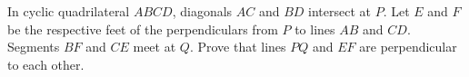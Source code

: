 In cyclic quadrilateral $ABCD$, diagonals $AC$ and $BD$ intersect at $P$. Let $E$ and $F$ be the respective feet of the perpendiculars from $P$ to lines $AB$ and $CD$. Segments $BF$ and $CE$ meet at $Q$. Prove that lines $PQ$ and $EF$ are perpendicular to each other.